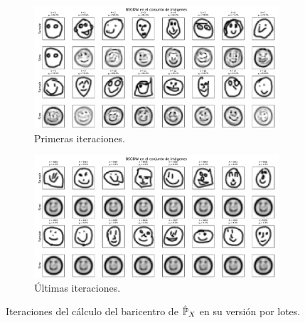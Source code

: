 \begin{figure}[htbp]
    \centering
    \begin{subfigure}[b]{0.95\textwidth}
        \includegraphics[width=\textwidth]{img/sgdw-iters/batch-first-iters-DS.pdf}
        \caption{Primeras iteraciones.}
        \label{fig:batch-first-iters-DS}
    \end{subfigure}
    \newline
    \begin{subfigure}[b]{0.95\textwidth}
        \includegraphics[width=\textwidth]{img/sgdw-iters/batch-last-iters-DS.pdf}
        \caption{Últimas iteraciones.}
        \label{fig:batch-last-iters-DS}
    \end{subfigure}
    \caption{Iteraciones del cálculo del baricentro de $\hat\Prob_X$ en su versión por lotes.}
    \label{fig:batch-iters-DS}
\end{figure}


